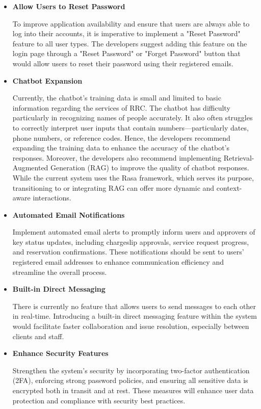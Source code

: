 \begin{itemize}
	
	\item \textbf{Allow Users to Reset Password}
	
	To improve application availability and ensure that users are always able to log into their accounts, it is imperative to implement a "Reset Password" feature to all user types. The developers suggest adding this feature on the login page through a "Reset Password" or "Forget Password" button that would allow users to reset their password using their registered emails.
	
	\item \textbf{Chatbot Expansion}
	
	Currently, the chatbot's training data is small and limited to basic information regarding the services of RRC. The chatbot has difficulty particularly in recognizing names of people accurately. It also often struggles to correctly interpret user inputs that contain numbers—particularly dates, phone numbers, or reference codes. Hence, the developers recommend expanding the training data to enhance the accuracy of the chatbot's responses. Moreover, the developers also recommend implementing Retrieval-Augmented Generation (RAG) to improve the quality of chatbot responses. While the current system uses the Rasa framework, which serves its purpose, transitioning to or integrating RAG can offer more dynamic and context-aware interactions. 
	
	\item \textbf{Automated Email Notifications}
	
	Implement automated email alerts to promptly inform users and approvers of key status updates, including chargeslip approvals, service request progress, and reservation confirmations. These notifications should be sent to users' registered email addresses to enhance communication efficiency and streamline the overall process.
	
	\item \textbf{Built-in Direct Messaging}
	
	There is currently no feature that allows users to send messages to each other in real-time. Introducing a built-in direct messaging feature within the system would facilitate faster collaboration and issue resolution, especially between clients and staff.
	
	\item \textbf{Enhance Security Features}
	
	Strengthen the system’s security by incorporating two-factor authentication (2FA), enforcing strong password policies, and ensuring all sensitive data is encrypted both in transit and at rest. These measures will enhance user data protection and compliance with security best practices.
	

\end{itemize}

